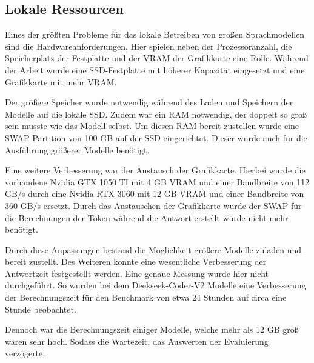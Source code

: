 \subsection{Lokale Ressourcen}
Eines der größten Probleme für das lokale Betreiben von großen Sprachmodellen sind die Hardwareanforderungen. Hier spielen neben der Prozessoranzahl, die Speicherplatz der Festplatte und der VRAM der Grafikkarte eine Rolle. Während der Arbeit wurde eine SSD-Festplatte mit höherer Kapazität eingesetzt und eine Grafikkarte mit mehr VRAM.\vspace{0.2cm}

Der größere Speicher wurde notwendig während des Laden und Speichern der Modelle auf die lokale SSD. Zudem war ein RAM notwendig, der doppelt so groß sein musste wie das Modell selbst. Um diesen RAM bereit zustellen wurde eine SWAP Partition von 100 GB auf der SSD eingerichtet. Dieser wurde auch für die Ausführung größerer Modelle benötigt.\vspace{0.2cm}

Eine weitere Verbesserung war der Austausch der Grafikkarte. Hierbei wurde die vorhandene Nvidia GTX 1050 TI mit 4 GB VRAM und einer Bandbreite von 112 GB/s durch eine Nvidia RTX 3060 mit 12 GB VRAM und einer Bandbreite von 360 GB/s ersetzt. Durch das Austauschen der Grafikkarte wurde der SWAP für die Berechnungen der Token während die Antwort erstellt wurde nicht mehr benötigt.

Durch diese Anpassungen bestand die Möglichkeit größere Modelle zuladen und bereit zustellt. Des Weiteren konnte eine wesentliche Verbesserung der Antwortzeit festgestellt werden. Eine genaue Messung wurde hier nicht durchgeführt. So wurden bei dem Deekseek-Coder-V2 Modelle eine Verbesserung der Berechnungszeit für den Benchmark von etwa 24 Stunden auf circa eine Stunde beobachtet.\vspace{0.2cm}

Dennoch war die Berechnungszeit einiger Modelle, welche mehr als 12 GB groß waren sehr hoch. Sodass die Wartezeit, das Auswerten der Evaluierung verzögerte.


